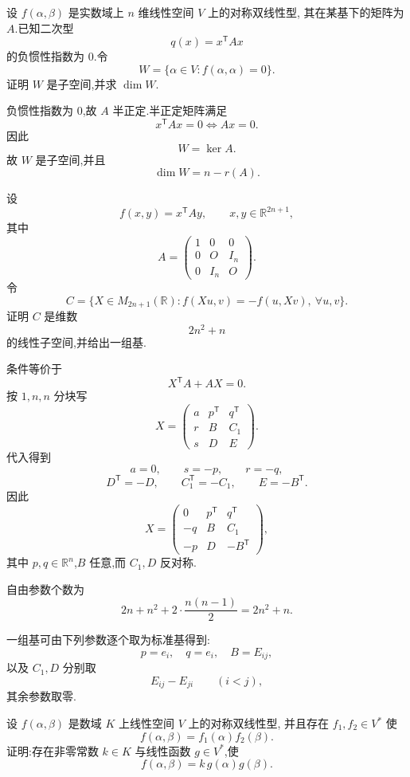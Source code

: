 \begin{example}[\markstar]
设 $f(\alpha,\beta)$ 是实数域上 $n$ 维线性空间 $V$ 上的对称双线性型,
其在某基下的矩阵为 $A$.已知二次型
\[
q(x)=x^{\mathsf T}Ax
\]
的负惯性指数为 $0$.令
\[
W=\{\alpha\in V:f(\alpha,\alpha)=0\}.
\]
证明 $W$ 是子空间,并求 $\dim W$.
\end{example}
\exampleblank

\begin{solution}
负惯性指数为 $0$,故 $A$ 半正定.半正定矩阵满足
\[
x^{\mathsf T}Ax=0
\iff
Ax=0.
\]
因此
\[
W=\ker A.
\]
故 $W$ 是子空间,并且
\[
\boxed{\dim W=n-r(A)}.
\]
\end{solution}


\begin{example}
设
\[
f(x,y)=x^{\mathsf T}Ay,
\qquad
x,y\in\mathbb{R}^{2n+1},
\]
其中
\[
A=
\begin{pmatrix}
1&0&0\\
0&O&I_n\\
0&I_n&O
\end{pmatrix}.
\]
令
\[
C=
\{X\in M_{2n+1}(\mathbb{R}):
f(Xu,v)=-f(u,Xv),\ \forall u,v\}.
\]
证明 $C$ 是维数
\[
2n^2+n
\]
的线性子空间,并给出一组基.
\end{example}
\exampleblank

\begin{solution}
条件等价于
\[
X^{\mathsf T}A+AX=0.
\]
按 $1,n,n$ 分块写
\[
X=
\begin{pmatrix}
a&p^{\mathsf T}&q^{\mathsf T}\\
r&B&C_1\\
s&D&E
\end{pmatrix}.
\]
代入得到
\[
a=0,\qquad s=-p,\qquad r=-q,
\]
\[
D^{\mathsf T}=-D,\qquad C_1^{\mathsf T}=-C_1,\qquad E=-B^{\mathsf T}.
\]
因此
\[
\boxed{
X=
\begin{pmatrix}
0&p^{\mathsf T}&q^{\mathsf T}\\
-q&B&C_1\\
-p&D&-B^{\mathsf T}
\end{pmatrix},
}
\]
其中 $p,q\in\mathbb{R}^n$,$B$ 任意,而 $C_1,D$ 反对称.

自由参数个数为
\[
2n+n^2+2\cdot\dfrac{n(n-1)}2
=
\boxed{2n^2+n}.
\]

一组基可由下列参数逐个取为标准基得到:
\[
p=e_i,\quad q=e_i,\quad B=E_{ij},
\]
以及 $C_1,D$ 分别取
\[
E_{ij}-E_{ji}\qquad(i<j),
\]
其余参数取零.
\end{solution}


\begin{example}
设 $f(\alpha,\beta)$ 是数域 $K$ 上线性空间 $V$ 上的对称双线性型,
并且存在 $f_1,f_2\in V^*$ 使
\[
f(\alpha,\beta)=f_1(\alpha)f_2(\beta).
\]
证明:存在非零常数 $k\in K$ 与线性函数 $g\in V^*$,使
\[
f(\alpha,\beta)=k\,g(\alpha)g(\beta).
\]
\end{example}
\exampleblank

